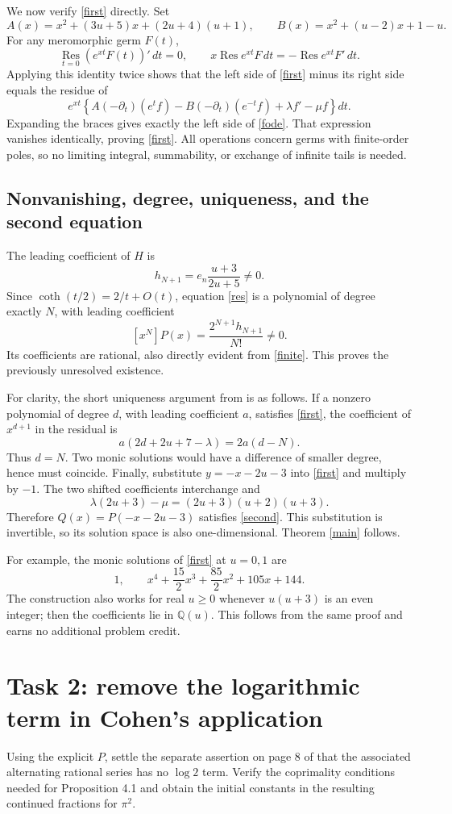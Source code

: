\documentclass[11pt]{article}
\newcommand{\Res}{\operatorname*{Res}}
\begin{document}
We now verify \eqref{first} directly. Set
\[
 A(x)=x^2+(3u+5)x+(2u+4)(u+1),\qquad
 B(x)=x^2+(u-2)x+1-u.
\]
For any meromorphic germ \(F(t)\),
\[
 \Res_{t=0}(e^{xt}F(t))'\,dt=0,\qquad
 x\Res e^{xt}F\,dt=-\Res e^{xt}F'\,dt.
\]
Applying this identity twice shows that the left side of
\eqref{first} minus its right side equals the residue of
\[
 e^{xt}\left\{
 A(-\partial_t)(e^tf)-B(-\partial_t)(e^{-t}f)
                    +\lambda f'-\mu f\right\}dt .
\]
Expanding the braces gives exactly the left side of \eqref{fode}.
That expression vanishes identically, proving \eqref{first}.
All operations concern germs with finite-order poles, so no limiting
integral, summability, or exchange of infinite tails is needed.

\subsection*{Nonvanishing, degree, uniqueness, and the second equation}
The leading coefficient of \(H\) is
\[
 h_{N+1}=e_n\frac{u+3}{2u+5}\ne0.
\]
Since \(\coth(t/2)=2/t+O(t)\), equation \eqref{res} is a polynomial
of degree exactly \(N\), with leading coefficient
\[
 [x^N]P(x)=\frac{2^{N+1}h_{N+1}}{N!}\ne0.
\]
Its coefficients are rational, also directly evident from
\eqref{finite}. This proves the previously unresolved existence.

For clarity, the short uniqueness argument from \cite{M} is as follows.
If a nonzero polynomial of degree \(d\), with leading coefficient \(a\),
satisfies \eqref{first}, the coefficient of \(x^{d+1}\) in the residual is
\[
 a(2d+2u+7-\lambda)=2a(d-N).
\]
Thus \(d=N\). Two monic solutions would have a difference of smaller
degree, hence must coincide.
Finally, substitute \(y=-x-2u-3\) into \eqref{first} and multiply by
\(-1\). The two shifted coefficients interchange and
\[
 \lambda(2u+3)-\mu=(2u+3)(u+2)(u+3).
\]
Therefore \(Q(x)=P(-x-2u-3)\) satisfies \eqref{second}.
This substitution is invertible, so its solution space is also
one-dimensional. Theorem \ref{main} follows.

For example, the monic solutions of \eqref{first} at \(u=0,1\) are
\[
 1,\qquad x^4+\frac{15}{2}x^3+\frac{85}{2}x^2+105x+144.
\]
The construction also works for real \(u\ge0\) whenever \(u(u+3)\)
is an even integer; then the coefficients lie in \(\mathbb Q(u)\).
This follows from the same proof and earns no additional problem credit.

\small
\section*{Task 2: remove the logarithmic term in Cohen's application}
Using the explicit \(P\), settle the separate assertion on page 8
of \cite{C} that the associated alternating rational series has no
\(\log 2\) term. Verify the coprimality conditions needed for
Proposition 4.1 and obtain the initial constants in the resulting
continued fractions for \(\pi^2\).
\end{document}
